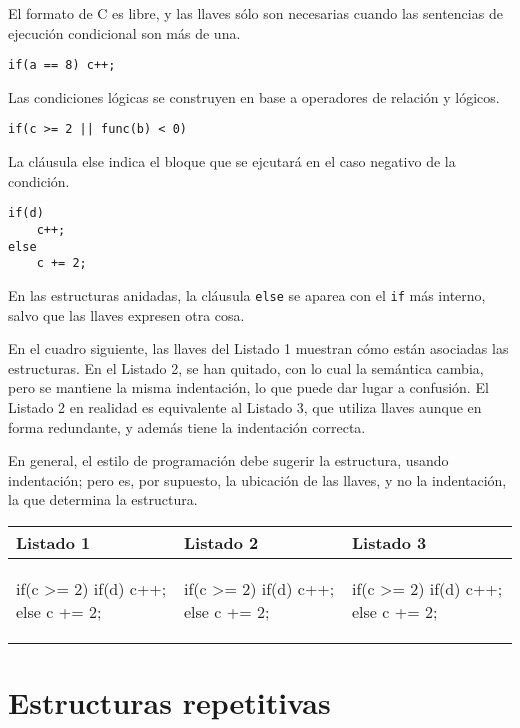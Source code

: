 \begin{ejemplo}
El formato de C es libre, y las llaves sólo son necesarias cuando las sentencias de ejecución condicional son más de una. 
\begin{lstlisting}
if(a == 8) c++;
\end{lstlisting}
Las condiciones lógicas se construyen en base a operadores de relación y lógicos. 
\begin{lstlisting}
if(c >= 2 || func(b) < 0)
\end{lstlisting}
La cláusula else indica el bloque que se ejcutará en el caso negativo de la condición. 
\begin{lstlisting}
if(d)
	c++;
else
	c += 2;
\end{lstlisting}
En las estructuras anidadas, la cláusula \texttt{else} se aparea
con el \texttt{if} más interno, salvo que las llaves expresen otra cosa. 

En el cuadro siguiente, las llaves del Listado 1 muestran cómo están asociadas las estructuras. En el Listado 2, se han quitado, con lo cual la semántica cambia, pero se mantiene la misma indentación, lo que puede dar lugar a confusión. El Listado 2 en realidad es equivalente al Listado 3, que utiliza llaves aunque en forma redundante, y además tiene la indentación correcta.

En general, el estilo de programación debe sugerir la estructura, usando indentación; pero es, por supuesto,
la ubicación de las llaves, y no la indentación, la que determina la
estructura.\\

\centering
\begin{tabular}{l|l|l}
Listado 1 & Listado 2 & Listado 3\\
\hline
\begin{codecell}
if(c >= 2) {
    if(d)
        c++;
} else
    c += 2;
\end{codecell}
&
\begin{codecell}
if(c >= 2) 
    if(d)
        c++;
else
    c += 2;
\end{codecell}
&
\begin{codecell}
if(c >= 2) { 
    if(d)
        c++;
	else
    	c += 2;
}
\end{codecell}
\end{tabular}
\end{ejemplo}

\section{Estructuras repetitivas}

